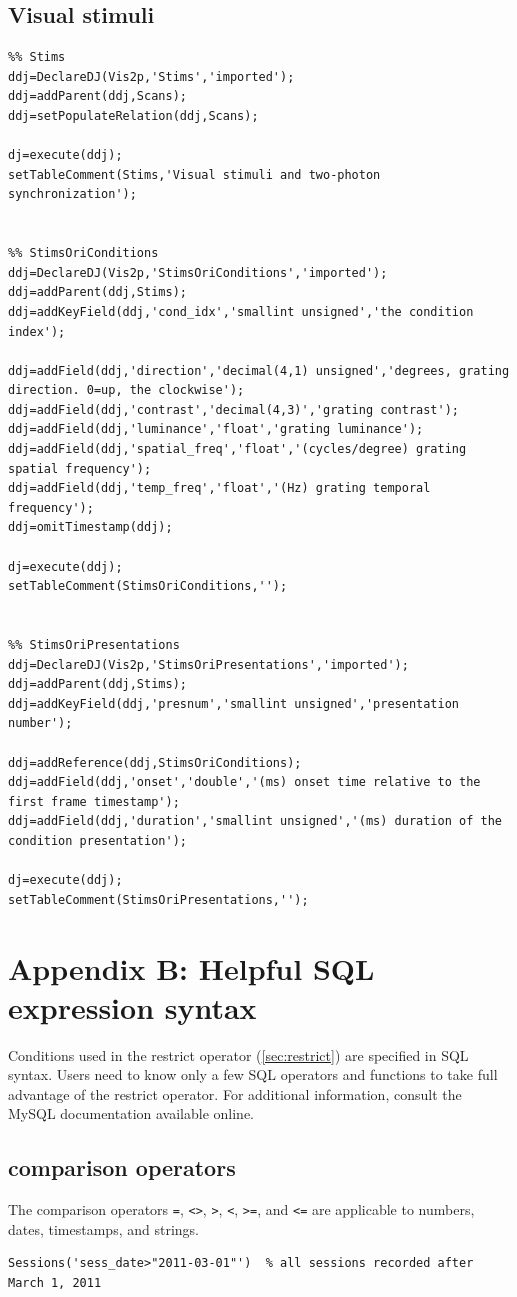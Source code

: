 \documentclass[10pt]{article}
\begin{document}
\subsection{Visual stimuli}\label{sec:visstims}
\begin{lstlisting}
%% Stims
ddj=DeclareDJ(Vis2p,'Stims','imported');
ddj=addParent(ddj,Scans);
ddj=setPopulateRelation(ddj,Scans);

dj=execute(ddj);
setTableComment(Stims,'Visual stimuli and two-photon synchronization');


%% StimsOriConditions
ddj=DeclareDJ(Vis2p,'StimsOriConditions','imported');
ddj=addParent(ddj,Stims);
ddj=addKeyField(ddj,'cond_idx','smallint unsigned','the condition index');

ddj=addField(ddj,'direction','decimal(4,1) unsigned','degrees, grating direction. 0=up, the clockwise');
ddj=addField(ddj,'contrast','decimal(4,3)','grating contrast');
ddj=addField(ddj,'luminance','float','grating luminance');
ddj=addField(ddj,'spatial_freq','float','(cycles/degree) grating spatial frequency');
ddj=addField(ddj,'temp_freq','float','(Hz) grating temporal frequency');
ddj=omitTimestamp(ddj);

dj=execute(ddj);
setTableComment(StimsOriConditions,'');


%% StimsOriPresentations
ddj=DeclareDJ(Vis2p,'StimsOriPresentations','imported');
ddj=addParent(ddj,Stims);
ddj=addKeyField(ddj,'presnum','smallint unsigned','presentation number');

ddj=addReference(ddj,StimsOriConditions);
ddj=addField(ddj,'onset','double','(ms) onset time relative to the first frame timestamp');
ddj=addField(ddj,'duration','smallint unsigned','(ms) duration of the condition presentation');

dj=execute(ddj);
setTableComment(StimsOriPresentations,'');
\end{lstlisting}

\section{Appendix B: Helpful SQL expression syntax}\label{sec:sql}
Conditions used in the restrict operator (\autoref{sec:restrict}) are specified in SQL syntax. Users need to know only a few SQL operators and functions to take full advantage of the restrict operator.  For additional information, consult the MySQL documentation available online. 
\subsection{comparison operators}
The comparison operators {\tt =}, {\tt <>}, {\tt >}, {\tt <}, {\tt >=}, and {\tt <=} are applicable to numbers, dates, timestamps, and strings. 
\begin{lstlisting}
Sessions('sess_date>"2011-03-01"')  % all sessions recorded after March 1, 2011
\end{lstlisting}
\end{document}
